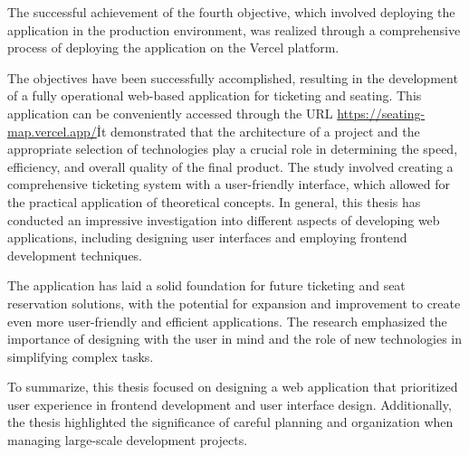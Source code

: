 The successful achievement of the fourth objective, which involved deploying the application in the production environment, was realized through a comprehensive process of deploying the application on the Vercel platform.

The objectives have been successfully accomplished, resulting in the development of a fully operational web-based application for ticketing and seating.
This application can be conveniently accessed through the URL \url{https://seating-map.vercel.app/}\.

It demonstrated that the architecture of a project and the appropriate selection of technologies play a crucial role in determining the speed, efficiency, and overall quality of the final product.
The study involved creating a comprehensive ticketing system with a user-friendly interface, which allowed for the practical application of theoretical concepts.
In general, this thesis has conducted an impressive investigation into different aspects of developing web applications, including designing user interfaces and employing frontend development techniques.

The application has laid a solid foundation for future ticketing and seat reservation solutions, with the potential for expansion and improvement to create even more user-friendly and efficient applications.
The research emphasized the importance of designing with the user in mind and the role of new technologies in simplifying complex tasks.

To summarize, this thesis focused on designing a web application that prioritized user experience in frontend development and user interface design.
Additionally, the thesis highlighted the significance of careful planning and organization when managing large-scale development projects.
